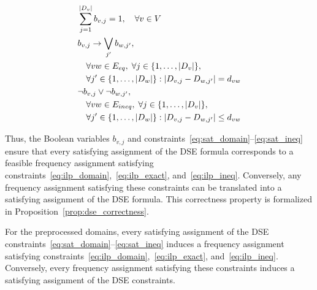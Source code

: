  \begin{align}
    & \sum_{j=1}^{|D_v|} b_{v,j} = 1, \quad \forall v \in V \label{eq:sat_domain} \\
    & b_{v,j} \rightarrow \bigvee_{j'} b_{w,j'}, \notag \\
    & \quad \forall vw \in E_{eq}, \; \forall j \in \{1, \dots, |D_v|\}, \notag \\
    & \quad \forall j' \in \{1, \dots, |D_w|\} : |D_{v,j} - D_{w,j'}| = d_{vw} \label{eq:sat_exact} \\
    & \neg b_{v,j} \vee \neg b_{w,j'}, \notag \\
    & \quad \forall vw \in E_{ineq}, \; \forall j \in \{1, \dots, |D_v|\}, \notag \\
    & \quad \forall j' \in \{1, \dots, |D_w|\} : |D_{v,j} - D_{w,j'}| \le d_{vw} \label{eq:sat_ineq}
\end{align}

Thus, the Boolean variables $b_{v,j}$ and constraints~\eqref{eq:sat_domain}--\eqref{eq:sat_ineq} ensure that every satisfying assignment of the DSE formula corresponds to a feasible frequency assignment satisfying constraints~\eqref{eq:ilp_domain},~\eqref{eq:ilp_exact}, and~\eqref{eq:ilp_ineq}. Conversely, any frequency assignment satisfying these constraints can be translated into a satisfying assignment of the DSE formula. This correctness property is formalized in Proposition~\ref{prop:dse_correctness}.

\begin{proposition}
\label{prop:dse_correctness}
For the preprocessed domains, every satisfying assignment of the DSE constraints~\eqref{eq:sat_domain}--\eqref{eq:sat_ineq} induces a frequency assignment satisfying constraints~\eqref{eq:ilp_domain},~\eqref{eq:ilp_exact}, and~\eqref{eq:ilp_ineq}. Conversely, every frequency assignment satisfying these constraints induces a satisfying assignment of the DSE constraints.
\end{proposition}

